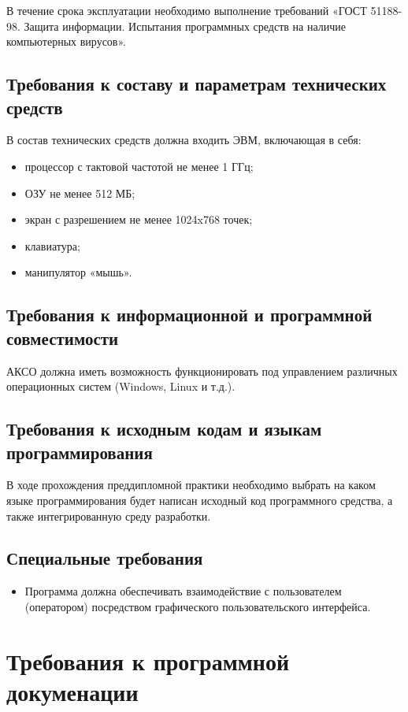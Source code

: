 \documentclass[a4paper,14pt]{extreport}
\begin{document}
	В течение срока эксплуатации необходимо выполнение требований «ГОСТ 51188-98. Защита информации. Испытания программных средств на наличие компьютерных вирусов».
	
	\subsection{Требования к составу и параметрам технических средств}
	В состав технических средств должна входить ЭВМ, включающая в себя:
	
	\begin{itemize}
		\item процессор с тактовой частотой не менее  1 ГГц;
		\item ОЗУ не менее 512 МБ;
		\item экран с разрешением не менее 1024x768 точек;
		\item клавиатура;
		\item манипулятор «мышь».
	\end{itemize}	
	
	\subsection{Требования к информационной и программной совместимости}
	
	АКСО должна иметь возможность функционировать под управлением различных операционных систем (Windows, Linux и т.д.).
	
	\subsection{Требования к исходным кодам и языкам программирования}
	
	В ходе прохождения преддипломной практики необходимо выбрать на каком языке программирования будет написан исходный код программного средства, а также интегрированную среду разработки.
	
	\subsection{Специальные требования}
	
\begin{itemize}
	\item 	Программа должна обеспечивать взаимодействие с пользователем (оператором) посредством графического пользовательского интерфейса.
\end{itemize}
	
	\section{Требования к программной докуменации}
\end{document}
